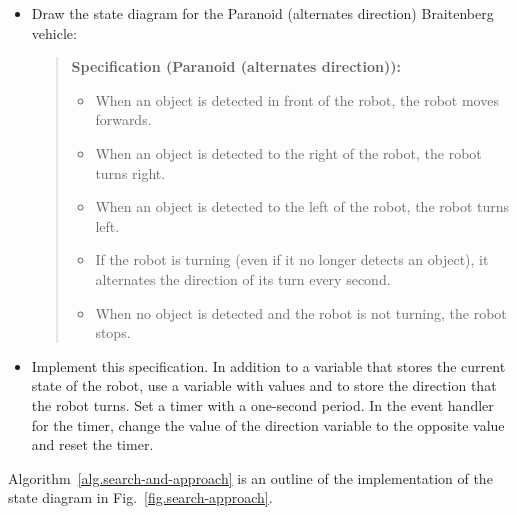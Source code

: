 \begin{framed}
\begin{itemize}
\item Draw the state diagram for the Paranoid (alternates direction) Braitenberg vehicle:
\begin{quote}
\normalsize\noindent\textbf{Specification (Paranoid (alternates direction)):}
\begin{itemize}
\item When an object is detected in front of the robot, the robot moves forwards. \item When an object is detected to the right of the robot, the robot turns right. 
\item When an object is detected to the left of the robot, the robot turns left. 
\item If the robot is turning (even if it no longer detects an object), it alternates the direction of its turn every second.
\item When no object is detected and the robot is not turning, the robot stops. 
\end{itemize}
\end{quote}
\item Implement this specification. In addition to a variable that stores the current state of the robot, use a variable with values  and  to store the direction that the robot turns. Set a timer with a one-second period. In the event handler for the timer, change the value of the direction variable to the opposite value and reset the timer.
\end{itemize}
\end{framed}

Algorithm~\ref{alg.search-and-approach} is an outline of the implementation of the state diagram in Fig.~\ref{fig.search-approach}.

